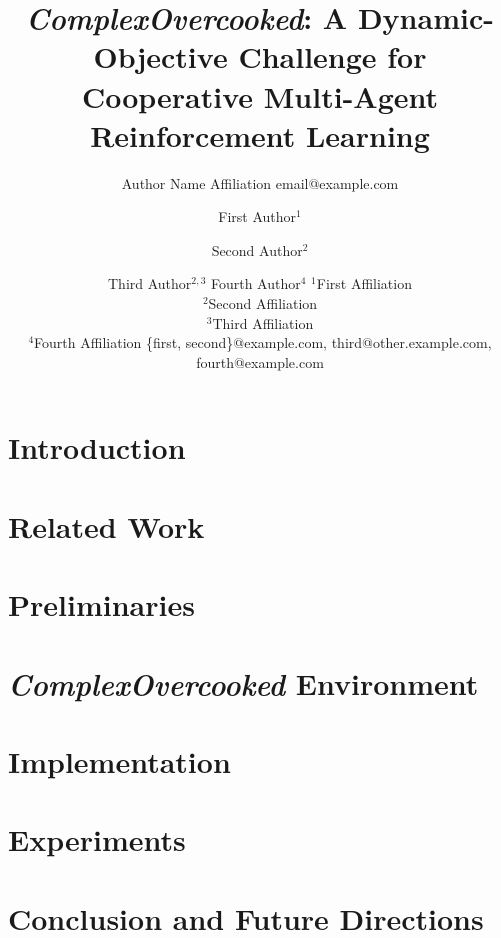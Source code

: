 \documentclass{article}
\title{\textit{ComplexOvercooked}: A Dynamic-Objective Challenge for Cooperative Multi-Agent Reinforcement Learning}
\author{
    Author Name
    \affiliations
    Affiliation
    \emails
    email@example.com
}
\author{
First Author$^1$
\and
Second Author$^2$\and
Third Author$^{2,3}$\And
Fourth Author$^4$
\affiliations
$^1$First Affiliation\\
$^2$Second Affiliation\\
$^3$Third Affiliation\\
$^4$Fourth Affiliation
\emails
\{first, second\}@example.com,
third@other.example.com,
fourth@example.com
}
\begin{document}
\maketitle


\section{Introduction}
\label{sec:intro}


\section{Related Work}
\label{sec:related}


\section{Preliminaries}
\label{sec:preliminary}


\section{\textit{ComplexOvercooked} Environment}
\label{sec:cbpr}


\section{Implementation}
\label{sec:imple}


\section{Experiments}
\label{sec:exp}


\section{Conclusion and Future Directions}
\label{sec:dis}





\newpage 
\clearpage
\appendix

\end{document}
